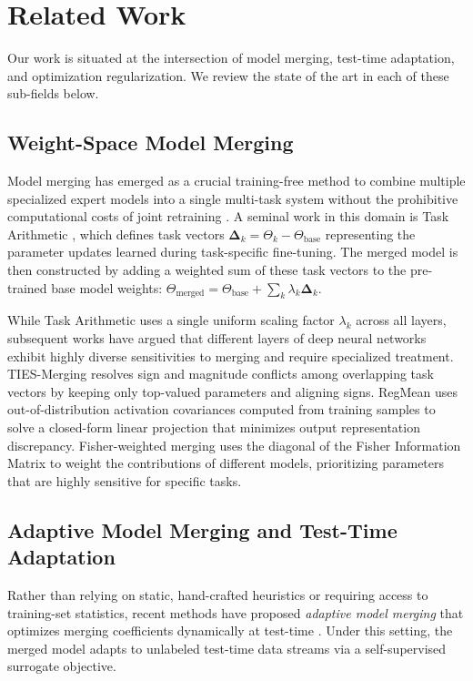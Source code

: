 \section{Related Work}
\label{sec:related_work}

Our work is situated at the intersection of model merging, test-time adaptation, and optimization regularization. We review the state of the art in each of these sub-fields below.

\subsection{Weight-Space Model Merging}
Model merging has emerged as a crucial training-free method to combine multiple specialized expert models into a single multi-task system without the prohibitive computational costs of joint retraining \cite{wortsman2022model, choshen2022fusing}. A seminal work in this domain is Task Arithmetic \cite{ilharco2022editing}, which defines task vectors $\mathbf{\Delta}_k = \Theta_k - \Theta_{\text{base}}$ representing the parameter updates learned during task-specific fine-tuning. The merged model is then constructed by adding a weighted sum of these task vectors to the pre-trained base model weights: $\Theta_{\text{merged}} = \Theta_{\text{base}} + \sum_k \lambda_k \mathbf{\Delta}_k$. 

While Task Arithmetic uses a single uniform scaling factor $\lambda_k$ across all layers, subsequent works have argued that different layers of deep neural networks exhibit highly diverse sensitivities to merging and require specialized treatment. TIES-Merging \cite{yadav2023ties} resolves sign and magnitude conflicts among overlapping task vectors by keeping only top-valued parameters and aligning signs. RegMean \cite{jin2022regmean} uses out-of-distribution activation covariances computed from training samples to solve a closed-form linear projection that minimizes output representation discrepancy. Fisher-weighted merging \cite{matena2022merging} uses the diagonal of the Fisher Information Matrix to weight the contributions of different models, prioritizing parameters that are highly sensitive for specific tasks. 

\subsection{Adaptive Model Merging and Test-Time Adaptation}
Rather than relying on static, hand-crafted heuristics or requiring access to training-set statistics, recent methods have proposed \emph{adaptive model merging} that optimizes merging coefficients dynamically at test-time \cite{yang2024adamerging, jung2026symerge}. Under this setting, the merged model adapts to unlabeled test-time data streams via a self-supervised surrogate objective. 

